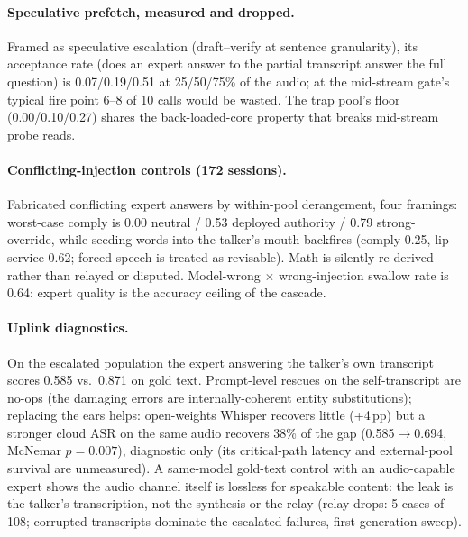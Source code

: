 \paragraph{Speculative prefetch, measured and dropped.} Framed as
speculative escalation (draft--verify at sentence granularity), its
acceptance rate (does an expert answer to the partial transcript
answer the full question) is 0.07/0.19/0.51 at 25/50/75\% of the audio;
at the mid-stream gate's typical fire point 6--8 of 10 calls would be
wasted. The trap pool's floor (0.00/0.10/0.27) shares the
back-loaded-core property that breaks mid-stream probe reads.

\paragraph{Conflicting-injection controls (172 sessions).} Fabricated
conflicting expert answers by within-pool derangement, four framings:
worst-case comply is 0.00 neutral / 0.53 deployed authority / 0.79
strong-override, while seeding words into the talker's mouth
backfires (comply 0.25, lip-service 0.62; forced speech is treated as
revisable). Math is silently re-derived rather than relayed or
disputed. Model-wrong $\times$ wrong-injection swallow rate is 0.64:
expert quality is the accuracy ceiling of the cascade.

\paragraph{Uplink diagnostics.} On the escalated population the expert
answering the talker's own transcript scores 0.585 vs.\ 0.871 on gold
text. Prompt-level rescues on the self-transcript are no-ops (the
damaging errors are internally-coherent entity substitutions);
replacing the ears helps: open-weights Whisper recovers little
(+4\,pp) but a stronger cloud ASR on the same audio recovers 38\% of
the gap (0.585$\to$0.694, McNemar $p{=}0.007$), diagnostic only (its
critical-path latency and external-pool survival are unmeasured). A
same-model gold-text control with an audio-capable expert shows the
audio channel itself is lossless for speakable content: the leak is
the talker's transcription, not the synthesis or the relay (relay
drops: 5 cases of 108; corrupted transcripts dominate the escalated
failures, first-generation sweep).

